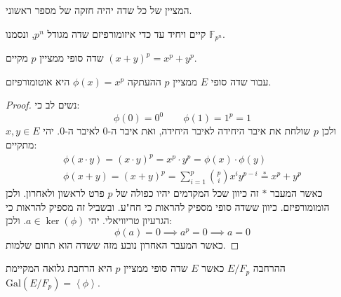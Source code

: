 \documentclass{tstextbook}
\begin{document}
\begin{reminder}
המציין של כל שדה יהיה חזקה של מספר ראשוני.

\end{reminder}
\begin{proposition}
קיים ויחיד עד כדי איזומורפיזם שדה מגודל \(p^{n}\), ונסמנו \(\mathbb{F}_{p^{n}}\).

\end{proposition}
\begin{proposition}
שדה סופי ממציין \(p\) מקיים \((x+y)^{p}=x^{p}+y^{p}\).

\end{proposition}
\begin{proposition}
עבור שדה סופי \(E\) ממציין \(p\) ההעתקה \(\phi(x)=x^{p}\) היא אוטומורפיזם.

\end{proposition}
\begin{proof}
נשים לב כי:
$$\phi(0)=0^{0}\qquad \phi(1)=1^{p}=1$$
ולכן \(p\) שולחת את איבר היחידה לאיבר היחידה, ואת איבר ה-0 לאיבר ה-0. יהי \(x,y \in E\) מתקיים:
\begin{gather*}\phi\left( x\cdot y \right)=\left( x\cdot y \right)^{p}=x^{p}\cdot y^{p}=\phi(x)\cdot \phi(y)  \\\phi(x+y)=(x+y)^{p}=\sum_{i=1}^{p} {p \choose i}x^{i}y^{p-i}\overset{*}{=} x^{p}+y^{p} 
\end{gather*}
כאשר המעבר \(*\) זה כיוון שכל המקדמים יהיו כפולה של \(p\) פרט לראשון ולאחרון. ולכן הומומורפיזם. כיוון ששדה סופי מספיק להראות כי חח"ע. ובשביל זה מספיק להראות כי הגרעיון טריוויאלי. יהי \(a \in \ker\left( \phi \right)\). ולכן:
$$\phi(a)=0\implies a^{p}=0\implies a=0$$
כאשר המעבר האחרון נובע מזה ששדה הוא תחום שלמות.

\end{proof}
\begin{proposition}
ההרחבה \(E / F_{p}\) כאשר \(E\) שדה סופי ממציין \(p\) היא הרחבת גלואה המקיימת \(\mathrm{Gal}(E / F_{p})=\left\langle  \phi  \right\rangle\).

\end{proposition}
\end{document}
